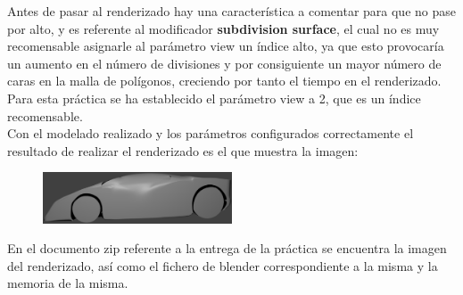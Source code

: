 \documentclass[10pt]{article}
\begin{document}
Antes de pasar al renderizado hay una característica a comentar para que no pase por alto, y es referente al modificador \textbf{subdivision surface}, el cual no es muy recomensable asignarle al parámetro view un índice alto, ya que esto provocaría un aumento en el número de divisiones y por consiguiente un mayor número de caras en la malla de polígonos, creciendo por tanto el tiempo en el renderizado. Para esta práctica se ha establecido el parámetro view a 2, que es un índice recomensable. \\

Con el modelado realizado y los parámetros configurados correctamente el resultado de realizar el renderizado es el que muestra la imagen:\\

\begin{figure}[H]
	\begin{center}
 		\includegraphics[width = 0.5\textwidth]{Imagenes/render.eps}
	\end{center} 
\end{figure}

En el documento zip referente a la entrega de la práctica se encuentra la imagen del renderizado, así como el fichero de blender correspondiente a la misma y la memoria de la misma.
\end{document}
